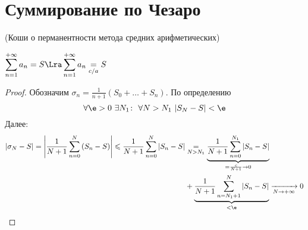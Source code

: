 \section{Суммирование по Чезаро}

\begin{theorem}(Коши о перманентности метода средних арифметических)

    $\displaystyle \sum_{n = 1}^{+\infty}{a_n} = S \Lra
    \displaystyle \sum_{n = 1}^{+\infty}{a_n} \underset{c/a}{=} S$
\end{theorem}
\begin{proof}
    Обозначим $\displaystyle \sigma_n = \frac{1}{n + 1} (S_0 + \ldots + S_n)$.
    По определению
\[
    \forall \e > 0~ \exists N_1\colon~ \forall N > N_1~ |S_N - S| < \e
\]
    Далее:
\begin{align*}
    |\sigma_N - S| =
    \left|\frac{1}{N + 1}\sum_{n = 0}^{N}{(S_n - S)}\right|
    \leqslant \frac{1}{N + 1}\sum_{n = 0}^{N}{|S_n - S|}
    &\underset{N > N_1}{=}
    \underbrace{\frac{1}{N + 1}\sum_{n = 0}^{N_1}{|S_n - S|}}_
    {= \frac{c}{N + 1}\to 0} \\
    &+ \underbrace{\frac{1}{N + 1}\sum_{n = N_1 + 1}^{N}{|S_n - S|}}
    _{< \e}
    \xrightarrow[N \to +\infty]{} 0
\end{align*}
\end{proof}
